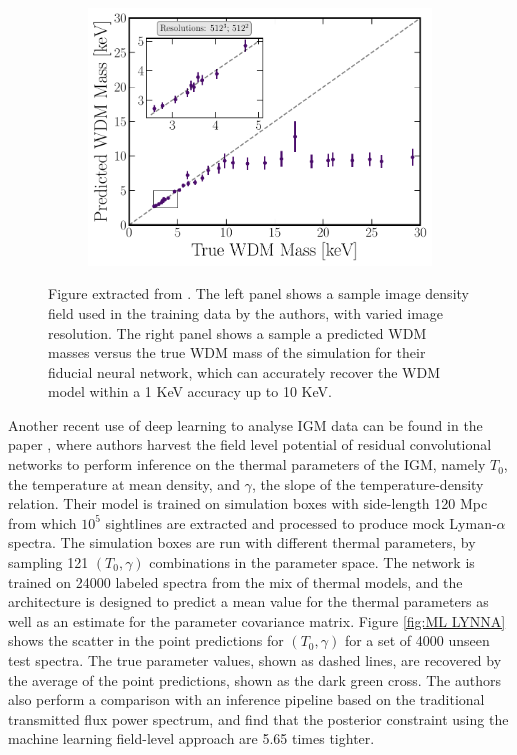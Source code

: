 \begin{figure}
\begin{subfigure}[b]{0.53\textwidth}
    \end{subfigure}
    \hfill
    \begin{subfigure}[b]{0.45\textwidth}
        \centering
        \includegraphics[width=1\textwidth]{img/ML/results_fixed_sim512_res512_z0.pdf}     
    \end{subfigure}
        \caption{Figure extracted from \cite{wdm_from_field}. The left panel shows a sample image density field used in the training data by the authors, with varied image resolution. The right panel shows a sample a predicted WDM masses versus the true WDM mass of the simulation for their fiducial neural network, which can accurately recover the WDM model within a 1 KeV accuracy up to 10 KeV.}
        \label{fig:ML paper wdm field}
\end{figure}

Another recent use of deep learning to analyse IGM data can be found in the paper  \cite{lynna}, where authors harvest the field level potential of residual convolutional networks to perform inference on the thermal parameters of the IGM, namely $T_0$, the temperature at mean density, and $\gamma$, the slope of the temperature-density relation. Their model is trained on simulation boxes with side-length 120 Mpc from which $10^5$ sightlines are extracted and processed to produce mock Lyman-$\alpha$ spectra. The simulation boxes are run with different thermal parameters, by sampling 121 $(T_0,\gamma)$ combinations in the parameter space. The network is trained on 24000 labeled spectra from the mix of thermal models, and the architecture is designed to predict a mean value for the thermal parameters as well as an estimate for the parameter covariance matrix. Figure \ref{fig:ML LYNNA} shows the scatter in the point predictions for $(T_0,\gamma)$ for a set of 4000 unseen test spectra. The true parameter values, shown as dashed lines, are recovered by the average of the point predictions, shown as the dark green cross. The authors also perform a comparison with an inference pipeline based on the traditional transmitted flux power spectrum, and find that the posterior constraint using the machine learning field-level approach are 5.65 times tighter.


